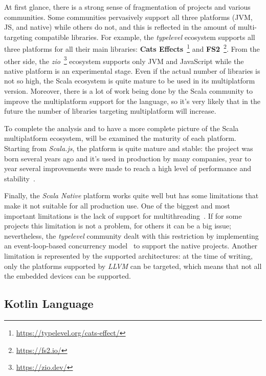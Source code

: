 At first glance, there is a strong sense of fragmentation of projects and various communities. Some communities pervasively support all three
platforms (JVM, JS, and native) while others do not, and this is reflected in the amount of multi-targeting compatible libraries.
For example, the \emph{typelevel} ecosystem supports all three platforms for all their main libraries:
\textbf{Cats Effects}~\footnote{\url{https://typelevel.org/cats-effect/}} and \textbf{FS2}~\footnote{\url{https://fs2.io/}}.
From the other side, the \emph{zio}~\footnote{\url{https://zio.dev/}} ecosystem supports only JVM and JavaScript while the native platform is an
experimental stage.
Even if the actual number of libraries is not so high, the Scala ecosystem is quite mature to be used in its multiplatform version.
Moreover, there is a lot of work being done by the Scala community to improve the multiplatform support for the language, so it's very likely that in
the future the number of libraries targeting multiplatform will increase.

To complete the analysis and to have a more complete picture of the Scala multiplatform ecosystem, will be examined the maturity of each platform.
Starting from \emph{Scala.js}, the platform is quite mature and stable: the project was born several years ago and it's used in production by many
companies, year to year several improvements were made to reach a high level of performance and stability~\cite{scala-js-performance, marr2016cross}.

Finally, the \emph{Scala Native} platform works quite well but has some limitations that make it not suitable for all production use.
One of the biggest and most important limitations is the lack of support for multithreading~\cite{scala-native-multithreading}.
If for some projects this limitation is not a problem, for others it can be a big issue; nevertheless, the \emph{typelevel} community dealt with this
restriction by implementing an event-loop-based concurrency model~\cite{scala-native-multithreading} to support the native projects.
Another limitation is represented by the supported architectures: at the time of writing, only the platforms supported by \emph{LLVM} can be targeted,
which means that not all the embedded devices can be supported.

\subsection{Kotlin Language}
\label{sec:kotlin-language}

